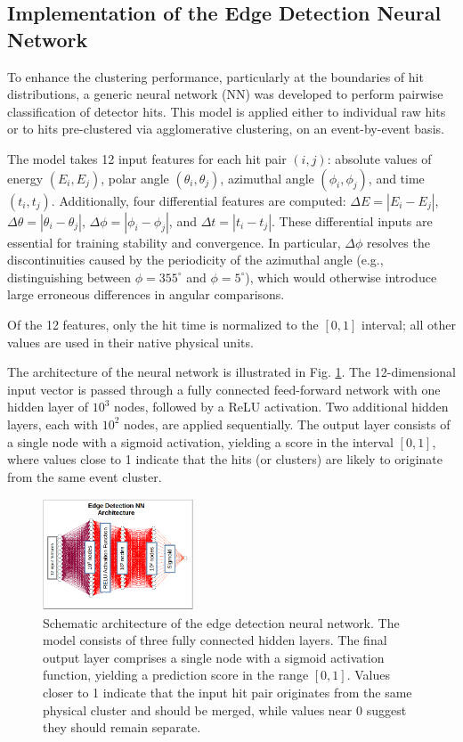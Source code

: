 \documentclass[final,5p,times,twocolumn]{elsarticle}
\begin{document}
\subsection{Implementation of the Edge Detection Neural Network}\label{s_sec:edge}
To enhance the clustering performance, particularly at the boundaries of hit distributions, a generic neural network (NN) was developed to perform pairwise classification of detector hits. This model is applied either to individual raw hits or to hits pre-clustered via agglomerative clustering, on an event-by-event basis.

The model takes 12 input features for each hit pair $(i, j)$: absolute values of energy $(E_i, E_j)$, polar angle $(\theta_i, \theta_j)$, azimuthal angle $(\phi_i, \phi_j)$, and time $(t_i, t_j)$. Additionally, four differential features are computed: $\Delta E = |E_i - E_j|$, $\Delta \theta = |\theta_i - \theta_j|$, $\Delta \phi = |\phi_i - \phi_j|$, and $\Delta t = |t_i - t_j|$. These differential inputs are essential for training stability and convergence. In particular, $\Delta \phi$ resolves the discontinuities caused by the periodicity of the azimuthal angle (e.g., distinguishing between $\phi = 355^\circ$ and $\phi = 5^\circ$), which would otherwise introduce large erroneous differences in angular comparisons.

Of the 12 features, only the hit time is normalized to the $[0, 1]$ interval; all other values are used in their native physical units.

The architecture of the neural network is illustrated in Fig. \ref{fig:architecture}. The 12-dimensional input vector is passed through a fully connected feed-forward network with one hidden layer of $10^3$ nodes, followed by a ReLU activation. Two additional hidden layers, each with $10^2$ nodes, are applied sequentially. The output layer consists of a single node with a sigmoid activation, yielding a score in the interval $[0, 1]$, where values close to 1 indicate that the hits (or clusters) are likely to originate from the same event cluster.
\begin{figure}[!htb]
	\centering 
	\includegraphics[width=0.4\textwidth]{architecture.png}	
	\caption{Schematic architecture of the edge detection neural network. The model consists of three fully connected hidden layers. The final output layer comprises a single node with a sigmoid activation function, yielding a prediction score in the range $[0, 1]$. Values closer to 1 indicate that the input hit pair originates from the same physical cluster and should be merged, while values near 0 suggest they should remain separate.}
	\label{fig:architecture}%
\end{figure}
\end{document}
